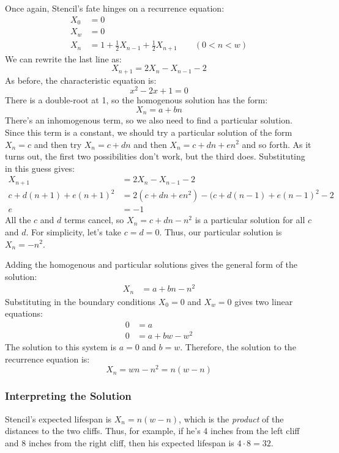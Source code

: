 Once again, Stencil's fate hinges on a recurrence equation:
%
\[
\begin{array}{rl}
X_0 & = 0 \\
X_w & = 0 \\
X_n & = 1 + \frac{1}{2} X_{n-1} + \frac{1}{2} X_{n+1} \qquad (0 < n < w)
\end{array}
\]
%
We can rewrite the last line as:
%
\[
X_{n+1} = 2 X_n - X_{n-1} - 2
\]
%
As before, the characteristic equation is:
%
\[
x^2 - 2 x + 1 = 0
\]
%
There is a double-root at 1, so the homogenous solution has the form:
%
\[
X_n = a + b n
\]
%
There's an inhomogenous term, so we also need to find a particular
solution.  Since this term is a constant, we should try a particular
solution of the form $X_n = c$ and then try $X_n = c + d n$ and then
$X_n = c + d n + e n^2$ and so forth.  As it turns out, the first two
possibilities don't work, but the third does.  Substituting in this
guess gives:
%
\begin{align*}
X_{n+1} & = 2 X_n - X_{n-1} - 2 \\
c + d(n+1) + e(n+1)^2 & = 2 (c + dn + en^2) - (c + d(n-1) + e(n-1)^2 - 2 \\
e & = -1
\end{align*}
%
All the $c$ and $d$ terms cancel, so $X_n = c + d n - n^2$ is a
particular solution for all $c$ and $d$.  For simplicity, let's take
$c = d = 0$.  Thus, our particular solution is $X_n = - n^2$.

Adding the homogenous and particular solutions gives the general form
of the solution:
%
\begin{align*}
X_n & = a + b n - n^2
\end{align*}
%
Substituting in the boundary conditions $X_0 = 0$ and $X_w = 0$ gives
two linear equations:
%
\begin{align*}
0 & = a \\
0 & = a + b w - w^2
\end{align*}
%
The solution to this system is $a = 0$ and $b = w$.  Therefore, the
solution to the recurrence equation is:
%
\[
X_n = w n - n^2 = n (w - n)
\]

\subsubsection*{Interpreting the Solution}

Stencil's expected lifespan is $X_n = n (w - n)$, which is the
\textit{product} of the distances to the two cliffs.  Thus, for
example, if he's 4 inches from the left cliff and 8 inches from the
right cliff, then his expected lifespan is $4 \cdot 8 = 32$.

